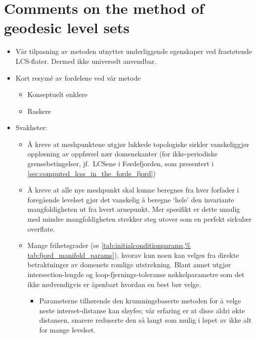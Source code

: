 \section{Comments on the method of geodesic level sets}
\label{sec:comments_on_the_method_of_geodesic_level_sets}

\begin{framed}
    \begin{itemize}
        \item Vår tilpasning av metoden utnytter underliggende egenskaper ved
            frastøtende LCS-flater. Dermed ikke universelt anvendbar.
        \item Kort resym{\'e} av fordelene ved vår metode
            \begin{itemize}
                \item Konseptuelt enklere
                \item Raskere
            \end{itemize}
        \item Svakheter:
            \begin{itemize}
                \item Å kreve at meshpunktene utgjør lukkede topologiske
                    sirkler vanskeliggjør oppløsning av oppførsel nær
                    domenekanter (for ikke-periodiske grensebetingelser, jf.\
                    LCSene i Førdefjorden, som presentert i
                    \cref{sec:computed_lcss_in_the_forde_fjord})
                \item Å kreve at alle nye meshpunkt skal kunne beregnes fra
                    hver forfader i foregående levelset gjør det vanskelig å
                    beregne `hele' den invariante mangfoldigheten ut fra hvert
                    arnepunkt. Mer spesifikt er dette umulig med mindre
                    mangfoldigheten strekker steg utover som en perfekt
                    sirkulær overflate.
                \item Mange frihetsgrader (se
                    \cref{tab:initialconditionparams,%
                    tab:fjord_manifold_params}), hvorav kun noen kan velges fra
                    direkte betraktninger av domenets romlige utstrekning.
                    Blant annet utgjør intersection-lengde og
                    loop-fjernings-toleranse nøkkelparametre som det ikke
                    nødvendigvis er åpenbart hvordan en best bør velge.
                    \begin{itemize}
                        \item Parameterne tilhørende den krumningsbaserte
                            metoden for å velge neste interset-distanse kan
                            sløyfes; vår erfaring er at disse aldri økte
                            distansen, snarere reduserte den så langt som mulig
                            i løpet av ikke alt for mange levelset.


\end{itemize}
\end{itemize}
\end{itemize}
\end{framed}
